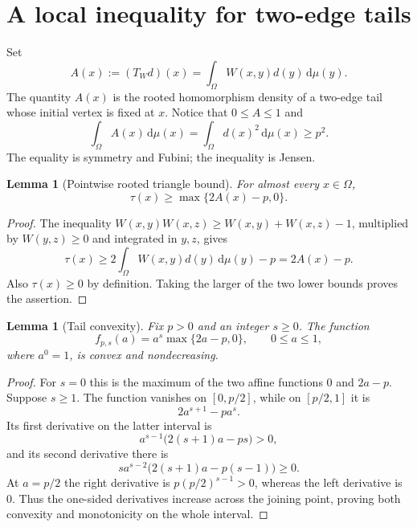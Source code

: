 \documentclass[11pt]{article}
\newtheorem{lemma}[theorem]{Lemma}
\newcommand{\dd}{\,\mathrm{d}}
\begin{document}
\section{A local inequality for two-edge tails}

Set
\[
A(x):=(T_Wd)(x)=\int_\Omega W(x,y)d(y)\dd\mu(y).
\]
The quantity $A(x)$ is the rooted homomorphism density of a two-edge tail
whose initial vertex is fixed at $x$.  Notice that $0\leq A\leq1$ and
\begin{equation}
\int_\Omega A(x)\dd\mu(x)
=\int_\Omega d(x)^2\dd\mu(x)
\geq p^2.
\label{eq:mean-A}
\end{equation}
The equality is symmetry and Fubini; the inequality is Jensen.

\begin{lemma}[Pointwise rooted triangle bound]
\label{lem:pointwise}
For almost every $x\in\Omega$,
\[
\tau(x)\geq \max\{2A(x)-p,0\}.
\]
\end{lemma}

\begin{proof}
The inequality
$W(x,y)W(x,z)\geq W(x,y)+W(x,z)-1$, multiplied by
$W(y,z)\geq0$ and integrated in $y,z$, gives
\[
\tau(x)
\geq
2\int_\Omega W(x,y)d(y)\dd\mu(y)-p
=2A(x)-p.
\]
Also $\tau(x)\geq0$ by definition.  Taking the larger of the two lower
bounds proves the assertion.
\end{proof}

\begin{lemma}[Tail convexity]
\label{lem:tail-convexity}
Fix $p>0$ and an integer $s\geq0$.  The function
\[
f_{p,s}(a)=a^s\max\{2a-p,0\},
\qquad 0\leq a\leq1,
\]
where $a^0=1$, is convex and nondecreasing.
\end{lemma}

\begin{proof}
For $s=0$ this is the maximum of the two affine functions $0$ and
$2a-p$.  Suppose $s\geq1$.  The function vanishes on $[0,p/2]$, while
on $[p/2,1]$ it is
\[
2a^{s+1}-pa^s.
\]
Its first derivative on the latter interval is
\[
a^{s-1}\bigl(2(s+1)a-ps\bigr)>0,
\]
and its second derivative there is
\[
s a^{s-2}\bigl(2(s+1)a-p(s-1)\bigr)\geq0.
\]
At $a=p/2$ the right derivative is
$p(p/2)^{s-1}>0$, whereas the left derivative is $0$.  Thus the
one-sided derivatives increase across the joining point, proving both
convexity and monotonicity on the whole interval.
\end{proof}


\end{document}
